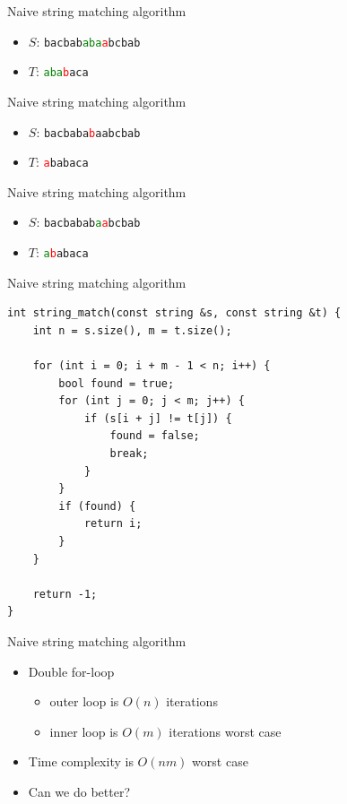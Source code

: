 \documentclass{beamer}
\begin{document}
	\begin{frame}[plain]{Naive string matching algorithm}
		\begin{itemize}
			\item $S$: \texttt{bacbab\textcolor{green}{aba}\textcolor{red}{a}bcbab}
			\item $T$: \texttt{\textcolor{green}{aba}\textcolor{red}{b}aca}
		\end{itemize}
	\end{frame}
	\begin{frame}[plain]{Naive string matching algorithm}
		\begin{itemize}
			\item $S$: \texttt{bacbaba\textcolor{red}{b}aabcbab}
			\item $T$: \texttt{\textcolor{red}{a}babaca}
		\end{itemize}
	\end{frame}
	\begin{frame}[plain]{Naive string matching algorithm}
		\begin{itemize}
			\item $S$: \texttt{bacbabab\textcolor{green}{a}\textcolor{red}{a}bcbab}
			\item $T$: \texttt{\textcolor{green}{a}\textcolor{red}{b}abaca}
		\end{itemize}
	\end{frame}
	
	\begin{frame}{Naive string matching algorithm}
		\begin{verbatim}
int string_match(const string &s, const string &t) {
	int n = s.size(), m = t.size();
	
	for (int i = 0; i + m - 1 < n; i++) {
		bool found = true;
		for (int j = 0; j < m; j++) {
			if (s[i + j] != t[j]) {
				found = false;
				break;
			}
		}
		if (found) {
			return i;
		}
	}
	
	return -1;
}
		\end{verbatim}
	\end{frame}
	
	\begin{frame}[plain]{Naive string matching algorithm}
		\begin{itemize}
			\item Double for-loop
			\begin{itemize}
				\item outer loop is $O(n)$ iterations
				\item inner loop is $O(m)$ iterations worst case
			\end{itemize}
			\item Time complexity is $O(nm)$ worst case
			\item<2-> Can we do better?
		\end{itemize}
	\end{frame}
	
\end{document}
